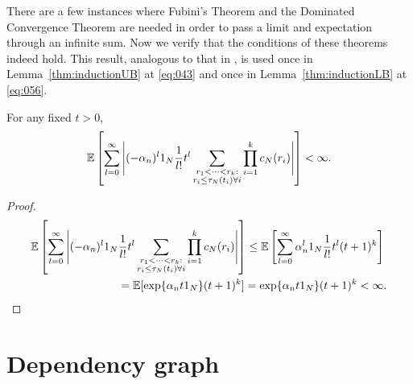 There are a few instances where Fubini's Theorem and the Dominated Convergence Theorem are needed in order to pass a limit and expectation through an infinite sum.
Now we verify that the conditions of these theorems indeed hold.
This result, analogous to that in \textcite[Appendix]{koskela2018}, is used once
in Lemma~\ref{thm:inductionUB} at \eqref{eq:043} and once in Lemma~\ref{thm:inductionLB} at \eqref{eq:056}.
\begin{lemma}\label{thm:DCT_Fubini}
For any fixed $t>0$,
\begin{equation*}
\mathbb{E} \left[ \sum_{l=0}^\infty \Bigg| (-\alpha_n)^l 1_N \frac{1}{l!} t^l 
        \sum_{\substack{r_1 < \cdots < r_k : \\ r_i \leq \tau_N(t_i) \forall i}}
        \prod_{i=1}^k c_N(r_i) \Bigg| \right]
< \infty .
\end{equation*}
\end{lemma}

\begin{proof}
\begin{align*}
\E \left[ \sum_{l=0}^\infty \Bigg| (-\alpha_n)^l \ON \frac{1}{l!} t^l 
        \sum_{\substack{r_1 < \cdots < r_k : \\ r_i \leq \tau_N(t_i) \forall i}}
        \prod_{i=1}^k c_N(r_i) \Bigg| \right]
&\leq \E \left[ \sum_{l=0}^\infty \alpha_n^l \ON \frac{1}{l!} t^l 
        (t+1)^k \right] \\
&\hspace{-4cm}= \E[ \exp\{ \alpha_n t \ON \} (t+1)^k ]
= \exp\{ \alpha_n t \ON \} (t+1)^k
< \infty .
\end{align*}
\end{proof}



\section{Dependency graph \seb{$\checkmark$} }


